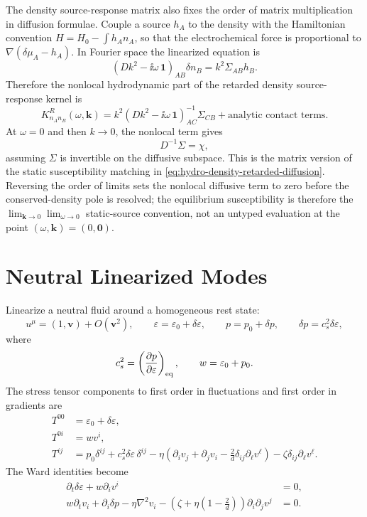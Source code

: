 The density source-response matrix also fixes the order of matrix
multiplication in diffusion formulae.  Couple a source \(h_A\) to the
density with the Hamiltonian convention \(H=H_0-\int h_A n_A\), so that the
electrochemical force is proportional to \(\nabla(\delta\mu_A-h_A)\).  In
Fourier space the linearized equation is
\[
  \left(Dk^2-\ii\omega\,\mathbf 1\right)_{AB}\delta n_B
  =
  k^2\Sigma_{AB}h_B .
\]
Therefore the nonlocal hydrodynamic part of the retarded density
source-response kernel is
\begin{equation}
  K^R_{n_An_B}(\omega,\mathbf k)
  =
  k^2
  \left(Dk^2-\ii\omega\,\mathbf 1\right)^{-1}_{AC}
  \Sigma_{CB}
  +\text{analytic contact terms}.
  \label{eq:hydro-multicharge-density-response}
\end{equation}
At \(\omega=0\) and then \(k\to0\), the nonlocal term gives
\[
  D^{-1}\Sigma=\chi,
\]
assuming \(\Sigma\) is invertible on the diffusive subspace.  This is the
matrix version of the static susceptibility matching in
\eqref{eq:hydro-density-retarded-diffusion}.  Reversing the order of limits
sets the nonlocal diffusive term to zero before the conserved-density pole is
resolved; the equilibrium susceptibility is therefore the
\(\lim_{\mathbf k\to0}\lim_{\omega\to0}\) static-source convention, not an
untyped evaluation at the point \((\omega,\mathbf k)=(0,\mathbf0)\).

\section{Neutral Linearized Modes}

Linearize a neutral fluid around a homogeneous rest state:
\[
  u^\mu=(1,\mathbf v)+O(\mathbf v^2),
  \qquad
  \varepsilon=\varepsilon_0+\delta\varepsilon,
  \qquad
  p=p_0+\delta p,
  \qquad
  \delta p=c_s^2\delta\varepsilon ,
\]
where
\[
  c_s^2=\left(\frac{\partial p}{\partial\varepsilon}\right)_{\rm eq},
  \qquad
  w=\varepsilon_0+p_0 .
\]
The stress tensor components to first order in fluctuations and first order
in gradients are
\begin{align}
  T^{00}&=\varepsilon_0+\delta\varepsilon,
  \label{eq:hydro-linear-t00}\\
  T^{0i}&=wv^i,
  \label{eq:hydro-linear-t0i}\\
  T^{ij}
  &=
  p_0\delta^{ij}
  +c_s^2\delta\varepsilon\,\delta^{ij}
  -\eta\left(\partial_i v_j+\partial_j v_i
  -\frac{2}{d}\delta_{ij}\partial_\ell v^\ell\right)
  -\zeta\delta_{ij}\partial_\ell v^\ell .
  \label{eq:hydro-linear-tij}
\end{align}
The Ward identities become
\begin{align}
  \partial_t\delta\varepsilon+w\partial_i v^i&=0,
  \label{eq:hydro-linear-energy}\\
  w\partial_t v_i+\partial_i\delta p
  -\eta\nabla^2v_i
  -\left(\zeta+\eta\left(1-\frac{2}{d}\right)\right)
  \partial_i\partial_jv^j&=0 .
  \label{eq:hydro-linear-momentum}
\end{align}

